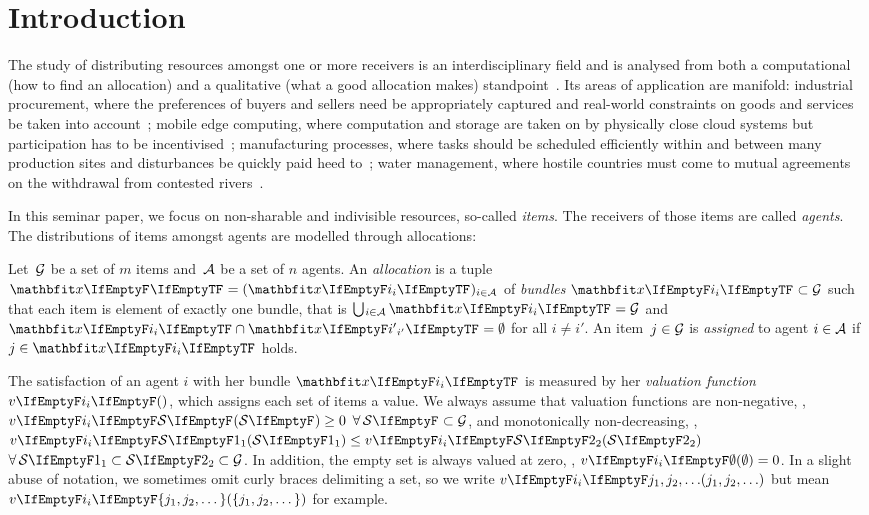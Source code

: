 \section{Introduction}
\label{sec:intro}

The study of distributing resources amongst one or more receivers is an interdisciplinary field and is analysed from both a computational (how to find an allocation) and a qualitative (what a good allocation makes) standpoint~\cite{survey}.
Its areas of application are manifold:
industrial procurement, where the preferences of buyers and sellers need be appropriately captured and real-world constraints on goods and services be taken into account~\cite{survey};
mobile edge computing, where computation and storage are taken on by physically close cloud systems but participation has to be incentivised~\cite{edge_computing_auction, edge_computing_report};
manufacturing processes, where tasks should be scheduled efficiently within and between many production sites and disturbances be quickly paid heed to~\cite{survey};
water management, where hostile countries must come to mutual agreements on the withdrawal from contested rivers~\cite{water_management}.

In this seminar paper, we focus on non-sharable and indivisible resources, so-called \emph{items}.
The receivers of those items are called \emph{agents}.
The distributions of items amongst agents are modelled through allocations:
\begin{definition}
	Let~\(\mathcal{G}\) be a set of \(m\) items and~\(\mathcal{A}\) be a set of \(n\) agents.
	An \emph{allocation} is a tuple \(\alloc[][] = (\alloc)_{i \in \agents}\) of \emph{bundles} \(\alloc \subset \goods\) such that each item is element of exactly one bundle, that is \(\mathop{\bigcup\hspace{-1pt}_{i \in \agents}} \alloc = \goods\) and \(\alloc \cap \alloc[][i'] = \emptyset\) for all \(i \neq i'\).
	An item~\(j \in \mathcal{G}\) is \emph{assigned} to agent \(i \in \mathcal{A}\) if \(j \in \alloc\) holds.
\end{definition}

The satisfaction of an agent \(i\) with her bundle \(\alloc\) is measured by her \emph{valuation function}~\(\valuations\), which assigns each set of items a value.
We always assume that valuation functions are non-negative, \ie, \(\valuations[\genericset] \ge 0\) \(\forall \genericset \subset \goods\), and monotonically non-decreasing, \ie, \(\valuations[\genericset[1]] \le \valuations[\genericset[2]]\) \(\forall \genericset[1] \subset \genericset[2] \subset \goods\).
In addition, the empty set is always valued at zero, \ie, \(\valuations[\emptyset] = 0\).
In a slight abuse of notation, we sometimes omit curly braces delimiting a set, so we write \(\valuations[j_1, j_2, \dots]\) but mean \(\valuations[\{j_1, j_2, \dots\}]\) for example.


